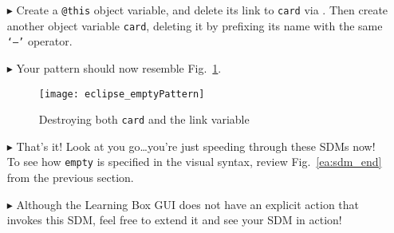 \begin{itemize}
\item[$\blacktriangleright$] Create a \texttt{@this} object variable, and delete its link to \texttt{card} via . Then create another
object variable \texttt{card}, deleting it by prefixing its name with the same \texttt{`--'} operator.

\vspace{0.5cm}

\item[$\blacktriangleright$] Your pattern should now resemble Fig.~\ref{eclipse:emptyPattern}.

\vspace{0.5cm}

\begin{figure}[htpb]
\begin{center}
  \texttt{[image: eclipse\_emptyPattern]}
  \caption{Destroying both \texttt{card} and the link variable}
  \label{eclipse:emptyPattern}
\end{center}
\end{figure}

\vspace{0.5cm}

\item[$\blacktriangleright$] That's it! Look at you go\ldots you're just speeding through these SDMs now! To see how \texttt{empty} is specified in the visual
syntax, review Fig.~\ref{ea:sdm_end} from the previous section.

\vspace{0.5cm}

\item[$\blacktriangleright$] Although the Learning Box GUI does not have an explicit action that invokes this SDM, feel free to extend it and see your SDM in
action!

\end{itemize}

